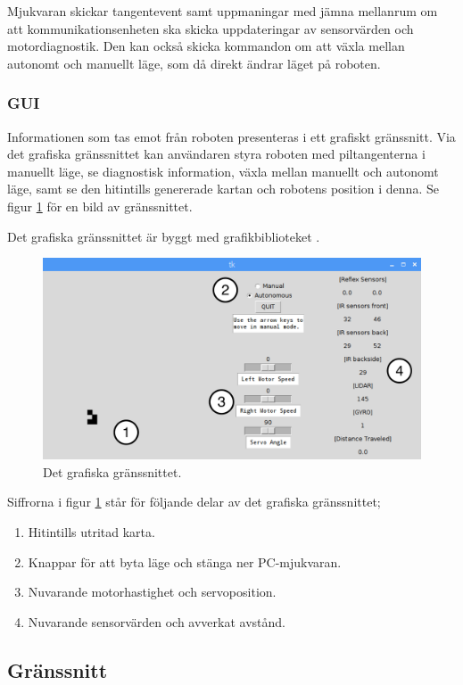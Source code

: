 \documentclass[a4paper,11pt]{article}
\begin{document}
Mjukvaran skickar tangentevent samt uppmaningar med jämna mellanrum om att kommunikationsenheten ska skicka uppdateringar av sensorvärden och motordiagnostik. Den kan också skicka kommandon om att växla mellan autonomt och manuellt läge, som då direkt ändrar läget på roboten.

\subsubsection{GUI}
Informationen som tas emot från roboten presenteras i ett grafiskt gränssnitt. Via det grafiska gränssnittet kan användaren styra roboten med piltangenterna i manuellt läge, se diagnostisk information, växla mellan manuellt och autonomt läge, samt se den hitintills genererade kartan och robotens position i denna. Se figur \ref{fig:gui} för en bild av gränssnittet.

Det grafiska gränssnittet är byggt med grafikbiblioteket \cite{tkinter}.

\begin{figure}[h!]
    \centering
    \includegraphics[scale=0.55]{gui_annotated.png}
    \caption{Det grafiska gränssnittet.}
    \label{fig:gui}
\end{figure}

Siffrorna i figur \ref{fig:gui} står för följande delar av det grafiska gränssnittet;
\begin{enumerate}
\item Hitintills utritad karta.
\item Knappar för att byta läge och stänga ner PC-mjukvaran.
\item Nuvarande motorhastighet och servoposition.
\item Nuvarande sensorvärden och avverkat avstånd.
\end{enumerate}

\subsection{Gränssnitt} \label{ssec:PCInterface}
\end{document}
